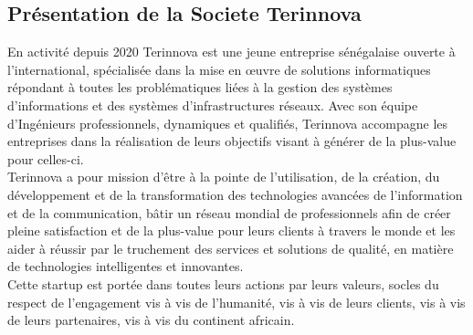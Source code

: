 \documentclass[a4paper, 12pt]{report}
\begin{document}
\subsection{Présentation de la Societe Terinnova}
  {En activité depuis 2020 Terinnova est une jeune entreprise sénégalaise ouverte à l’international, spécialisée dans la mise en œuvre de solutions informatiques répondant à toutes les problématiques liées à la gestion des systèmes d’informations et des systèmes d’infrastructures réseaux. Avec son équipe d’Ingénieurs professionnels, dynamiques et qualifiés, Terinnova accompagne les entreprises dans la réalisation de leurs objectifs visant à générer de la plus-value pour celles-ci. \\
  Terinnova a pour mission d’être à la pointe de l’utilisation, de la création, du développement et de la transformation des technologies avancées de l’information et de la communication, bâtir un réseau mondial de professionnels afin de créer pleine satisfaction et de la plus-value pour leurs clients à travers le monde et les aider à réussir par le truchement des services et solutions de qualité, en matière de technologies intelligentes et innovantes. 
  \\
  Cette startup est portée dans toutes leurs actions par leurs valeurs, socles du respect de l'engagement vis à vis de l’humanité, vis à vis de leurs clients, vis à vis de leurs partenaires, vis à vis du continent africain.}
\end{document}
